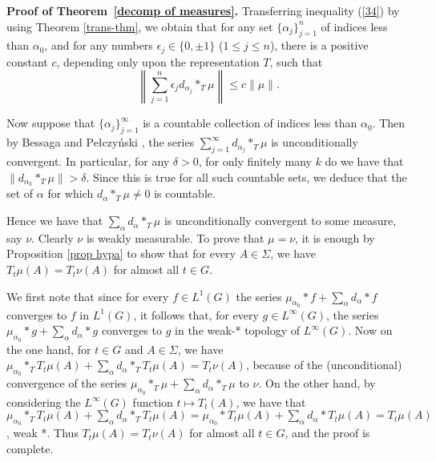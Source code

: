\documentclass[12pt,leqno]{article}
\begin{document}
\noindent
{\bf Proof of Theorem~\ref{decomp of measures}.}  
Transferring inequality (\ref{34}) by using Theorem \ref{trans-thm}, we obtain that 
for any set $\{\alpha_j\}_{j=1}^n$ of indices
less than $\alpha_0$, and
for any numbers $\epsilon_j \in \{0,\pm 1\}$ ($1 \le j \le n$),
there is a positive constant $c$, depending only upon the
representation $T$, such that
\begin{equation}
\left\|
\sum_{j=1}^n
\epsilon_j d_{\alpha_j} *_T \mu
\right\|
\leq c \|\mu\|.
\end{equation}

Now suppose that $\{\alpha_j\}_{j=1}^\infty$ is a countable collection of
indices less than $\alpha_0$.  
Then by Bessaga and Pe\l czy\'nski \cite{bp}, the series
$\sum_{j=1}^\infty d_{\alpha_j} *_T \mu$ is unconditionally convergent.
In particular, for any $\delta>0$, for only finitely many $k$ do we have
that $\| d_{\alpha_k} *_T \mu \| > \delta$.  Since this is true for all
such countable sets, we deduce that the set of $\alpha$ for which
$ d_\alpha *_T \mu \ne 0$ is countable.

Hence we have that 
$\sum_\alpha d_{\alpha} *_T \mu$ is unconditionally convergent
to some measure, say $\nu$.
Clearly $\nu$ is weakly measurable.  To prove that
$\mu=\nu$, it is enough by Proposition \ref{prop hypa} to show that
for every $A\in\Sigma$, we have
$T_t\mu(A)=T_t\nu(A)$
for almost all $t\in G$.

We first note that since for every $f\in L^1(G)$
the series $\mu_{\alpha_0}*f+ \sum_\alpha d_\alpha *f$ converges to $f$
in $L^1(G)$, it follows that, for every $g\in L^\infty(G)$,
the series $\mu_{\alpha_0}*g+ \sum_\alpha d_\alpha *g$
converges to $g$ in the weak-* topology of $L^\infty(G)$.
Now on the one hand, for $t\in G$ and $A\in \Sigma$, we have
$\mu_{\alpha_0}*_TT_t\mu(A)+ \sum_\alpha d_\alpha *_T T_t\mu(A)=T_t\nu(A)$, 
because of the (unconditional) convergence of
the series $\mu_{\alpha_0}*_T\mu+ \sum_\alpha d_\alpha *_T\mu$ to $\nu$.
On the other hand, by considering the $L^\infty(G)$ function
 $t\mapsto T_t(A)$, we have that
$\mu_{\alpha_0}*_TT_t\mu(A)+ \sum_\alpha d_\alpha *_T T_t\mu(A)=
\mu_{\alpha_0}*T_t\mu(A)+ \sum_\alpha d_\alpha * T_t\mu(A)=T_t\mu(A)$,
weak *.  Thus $T_t\mu(A)=T_t\nu(A)$ for almost all $t\in G$, and the
proof is complete.




\end{document}
